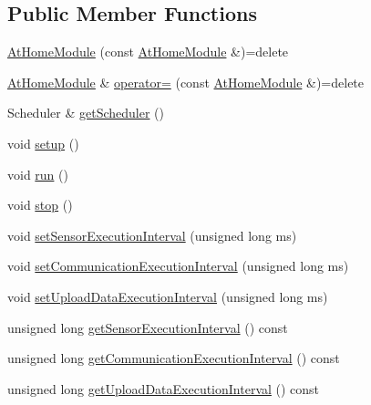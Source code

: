 \subsection*{Public Member Functions}
\begin{DoxyCompactItemize}
\item 
\mbox{\hyperlink{classathome_1_1module_1_1_at_home_module_ad78045943a579874ec16e14cf976eada}{At\+Home\+Module}} (const \mbox{\hyperlink{classathome_1_1module_1_1_at_home_module}{At\+Home\+Module}} \&)=delete
\item 
\mbox{\hyperlink{classathome_1_1module_1_1_at_home_module}{At\+Home\+Module}} \& \mbox{\hyperlink{classathome_1_1module_1_1_at_home_module_aec07a48057f5d52c9adaea375a6a7ad4}{operator=}} (const \mbox{\hyperlink{classathome_1_1module_1_1_at_home_module}{At\+Home\+Module}} \&)=delete
\item 
Scheduler \& \mbox{\hyperlink{classathome_1_1module_1_1_at_home_module_a954f37f05e5738f270a35fef58782ba6}{get\+Scheduler}} ()
\item 
void \mbox{\hyperlink{classathome_1_1module_1_1_at_home_module_a5354c736954a788c51e7cf25f6ccf89d}{setup}} ()
\item 
void \mbox{\hyperlink{classathome_1_1module_1_1_at_home_module_ac39915bf4a255e3610515bc18af3029d}{run}} ()
\item 
void \mbox{\hyperlink{classathome_1_1module_1_1_at_home_module_a5589c1eb7edd2ab45d0a3de7bb475bbe}{stop}} ()
\item 
void \mbox{\hyperlink{classathome_1_1module_1_1_at_home_module_a9a3b04d8f83ecbe0e8e368b697449326}{set\+Sensor\+Execution\+Interval}} (unsigned long ms)
\item 
void \mbox{\hyperlink{classathome_1_1module_1_1_at_home_module_ad28a042bd9f793d9dbd944ec4f76156b}{set\+Communication\+Execution\+Interval}} (unsigned long ms)
\item 
void \mbox{\hyperlink{classathome_1_1module_1_1_at_home_module_aa02b94ab5009d59d337144db364053a6}{set\+Upload\+Data\+Execution\+Interval}} (unsigned long ms)
\item 
unsigned long \mbox{\hyperlink{classathome_1_1module_1_1_at_home_module_ae0d4458da2bafd104386671d300fb562}{get\+Sensor\+Execution\+Interval}} () const
\item 
unsigned long \mbox{\hyperlink{classathome_1_1module_1_1_at_home_module_a263fe0bea2fa480b3885fee07e2a8221}{get\+Communication\+Execution\+Interval}} () const
\item 
unsigned long \mbox{\hyperlink{classathome_1_1module_1_1_at_home_module_a6186e04da0e46cf463d24947538380bb}{get\+Upload\+Data\+Execution\+Interval}} () const

\end{DoxyCompactItemize}
